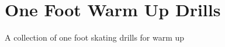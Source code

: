 \section*{One Foot Warm Up Drills}
\label{sec:sticky:one_foot:warm_up}

A collection of one foot skating drills for warm up
